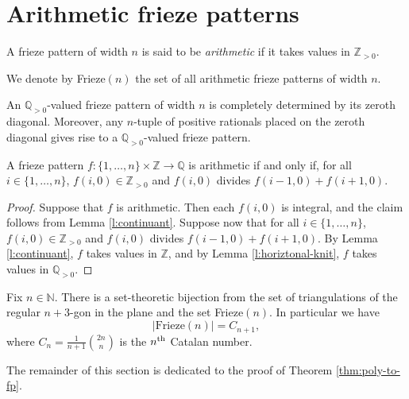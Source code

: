 \chapter{Arithmetic frieze patterns}
\begin{definition}
\label{def:arith-fp}
    A frieze pattern of width $n$ is said to be \textit{arithmetic} if it takes values in $\mathbb{Z}_{>0}$. 
\end{definition}

We denote by Frieze$(n)$ the set of all arithmetic frieze patterns of width $n$. 

\begin{lemma}
    \label{l:horiztonal-knit}
    An $\mathbb{Q}_{>0}$-valued frieze pattern of width $n$ is completely determined by its
    zeroth diagonal. Moreover, any $n$-tuple of positive rationals placed on the zeroth diagonal 
    gives rise to a $\mathbb{Q}_{>0}$-valued frieze pattern.
\end{lemma}

\begin{lemma}
    \label{l:lower-bound-crit}
    A frieze pattern $f : \{1,\ldots, n\} \times \mathbb{Z} \to \mathbb{Q}$ is arithmetic if and only if, 
    for all $i \in \{1, \ldots , n\}$, $f(i,0) \in \mathbb{Z}_{>0}$ and $f(i,0)$ divides $f(i-1,0) + f(i+1,0)$.
\end{lemma}
\begin{proof}
    Suppose that $f$ is arithmetic. Then each $f(i,0)$ is integral, and the claim follows from Lemma \ref{l:continuant}. 
    Suppose now that for all $i \in \{1, \ldots , n\}$, $f(i,0) \in \mathbb{Z}_{>0}$ and $f(i,0)$ divides $f(i-1,0) + f(i+1,0)$. By 
    Lemma \ref{l:continuant}, $f$ takes values in $\mathbb{Z}$, and by Lemma \ref{l:horiztonal-knit}, $f$ takes values in $\mathbb{Q}_{>0}$. 
\end{proof}

\begin{theorem}
\label{thm:poly-to-fp}
    Fix $n \in \mathbb{N}$. There is a set-theoretic bijection from the set of triangulations of the regular $n+3$-gon in the plane
    and the set Frieze$(n)$. In particular we have
    \[
        |\text{Frieze}(n)| = C_{n+1},
    \]
    where $C_n = \frac{1}{n+1}\binom{2n}{n}$ is the $n^{\rm th}$ Catalan number.
\end{theorem}

The remainder of this section is dedicated to the proof of Theorem \ref{thm:poly-to-fp}. 

